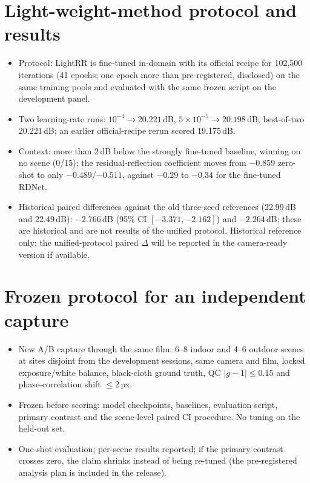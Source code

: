 \documentclass[10pt]{article}
\begin{document}
\section{Light-weight-method protocol and results}\label{supp:lightrr}
\begin{itemize}
\item Protocol: LightRR is fine-tuned in-domain with its official recipe for 102,500
  iterations (41 epochs; one epoch more than pre-registered, disclosed) on the same
  training pools and evaluated with the same frozen script on the development panel.
\item Two learning-rate runs: $10^{-4}\rightarrow20.221$\,dB,
  $5\times10^{-5}\rightarrow20.198$\,dB; best-of-two $20.221$\,dB; an earlier
  official-recipe rerun scored 19.175\,dB.
\item Context: more than 2\,dB below the strongly fine-tuned baseline, winning on no
  scene (0/15); the residual-reflection coefficient moves from $-0.859$ zero-shot to
  only $-0.489$/$-0.511$, against $-0.29$ to $-0.34$ for the fine-tuned RDNet.
\item Historical paired differences against the old three-seed references
  (22.99\,dB and 22.49\,dB): $-2.766$\,dB (95\% CI $[-3.371,-2.162]$) and
  $-2.264$\,dB; these are historical and are not results of the unified protocol.
  Historical reference only; the unified-protocol paired $\Delta$ will be reported in
  the camera-ready version if available.
\end{itemize}

\section{Frozen protocol for an independent capture}\label{supp:indep}
\begin{itemize}
\item New A/B capture through the same film: 6--8 indoor and 4--6 outdoor scenes at
  sites disjoint from the development sessions, same camera and film, locked
  exposure/white balance, black-cloth ground truth, QC $|g-1|\le0.15$ and
  phase-correlation shift $\le2$\,px.
\item Frozen before scoring: model checkpoints, baselines, evaluation script, primary
  contrast and the scene-level paired CI procedure. No tuning on the held-out set.
\item One-shot evaluation; per-scene results reported; if the primary contrast
  crosses zero, the claim shrinks instead of being re-tuned (the pre-registered
  analysis plan is included in the release).
\end{itemize}
\end{document}
